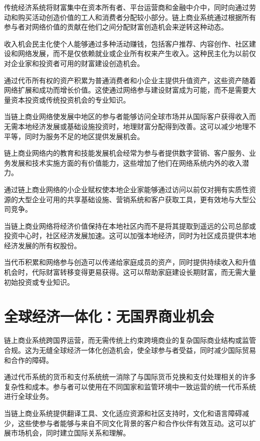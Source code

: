 \documentclass[
  Letterpaper,
]{scrbook}
\begin{document}
传统经济系统将财富集中在资本所有者、平台运营商和金融中介中，同时向通过劳动和购买活动创造价值的工人和消费者分配较小部分。链上商业系统通过根据所有参与者对网络价值的贡献在他们之间分配财富创造机会来逆转这种动态。

收入机会民主化使个人能够通过多种活动赚钱，包括客户推荐、内容创作、社区建设和网络发展，而不是仅依赖就业或企业所有权来产生收入。这种民主化为以前仅对企业家和投资者可用的财富建设创造机会。

通过代币所有权的资产积累为普通消费者和小企业主提供升值资产，这些资产随着网络扩展和成功而增长价值。这使通过网络参与建设财富成为可能，而不是需要大量资本投资或传统投资机会的专业知识。

当链上商业网络使发展中地区的参与者能够访问全球市场并从国际客户获得收入而无需本地经济发展或基础设施投资时，地理财富分配得到改善。这可以减少地理不平等，同时为服务不足的地区提供发展机会。

链上商业网络内的教育和技能发展机会经常为参与者提供数字营销、客户服务、业务发展和技术实施方面的有价值能力，这些增加了他们在网络系统内外的收入潜力。

通过链上商业网络的小企业赋权使本地企业家能够通过访问以前仅对拥有实质性资源的大型企业可用的共享基础设施、营销系统和客户获取工具，更有效地与大型公司竞争。

当链上商业网络将经济价值保持在本地社区内而不是将其提取到遥远的公司总部或投资中心时，社区经济发展加速。这可以加强本地经济，同时为社区成员提供本地经济发展的所有权股份。

当代币积累和网络参与创造可以传递给家庭成员的资产，同时提供持续收入和升值机会时，代际财富转移变得更易获得。这可以帮助家庭建设长期财富，而无需大量初始投资或专业知识。

\section{全球经济一体化：无国界商业机会}\label{ux5168ux7403ux7ecfux6d4eux4e00ux4f53ux5316ux65e0ux56fdux754cux5546ux4e1aux673aux4f1a}

链上商业系统跨国界运营，而无需传统上约束跨境商业的复杂国际商业结构或监管合规。这为无缝全球经济一体化创造机会，使全球参与者受益，同时减少国际贸易和合作的障碍。

通过代币系统的货币和支付系统统一消除了与国际货币兑换和支付处理相关的许多复杂性和成本。参与者可以使用在不同国家和监管环境中一致运营的统一代币系统进行全球业务。

当链上商业系统提供翻译工具、文化适应资源和社区支持时，文化和语言障碍减少，这些使参与者能够与来自不同文化背景的客户和合作伙伴有效互动。这可以扩展市场机会，同时建立国际关系和理解。
\end{document}
